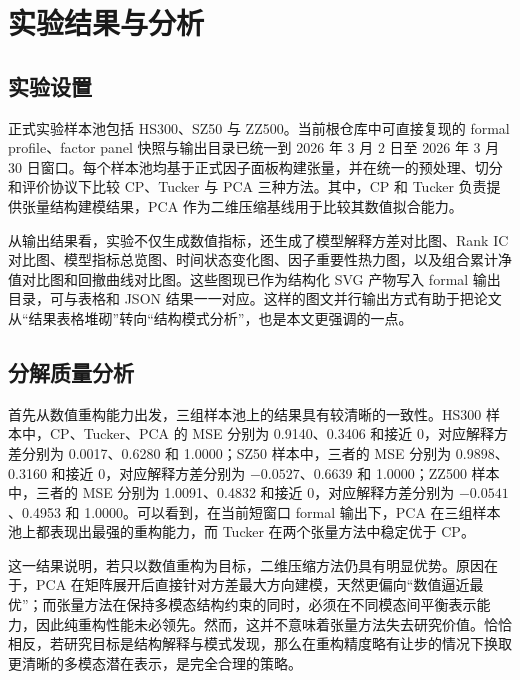 \chapter{实验结果与分析}

\section{实验设置}

正式实验样本池包括 HS300、SZ50 与 ZZ500。当前根仓库中可直接复现的 formal profile、factor panel 快照与输出目录已统一到 2026 年 3 月 2 日至 2026 年 3 月 30 日窗口。每个样本池均基于正式因子面板构建张量，并在统一的预处理、切分和评价协议下比较 CP、Tucker 与 PCA 三种方法。其中，CP 和 Tucker 负责提供张量结构建模结果，PCA 作为二维压缩基线用于比较其数值拟合能力。

从输出结果看，实验不仅生成数值指标，还生成了模型解释方差对比图、Rank IC 对比图、模型指标总览图、时间状态变化图、因子重要性热力图，以及组合累计净值对比图和回撤曲线对比图。这些图现已作为结构化 SVG 产物写入 formal 输出目录，可与表格和 JSON 结果一一对应。这样的图文并行输出方式有助于把论文从“结果表格堆砌”转向“结构模式分析”，也是本文更强调的一点。

\section{分解质量分析}

首先从数值重构能力出发，三组样本池上的结果具有较清晰的一致性。HS300 样本中，CP、Tucker、PCA 的 MSE 分别为 0.9140、0.3406 和接近 0，对应解释方差分别为 0.0017、0.6280 和 1.0000；SZ50 样本中，三者的 MSE 分别为 0.9898、0.3160 和接近 0，对应解释方差分别为 $-0.0527$、0.6639 和 1.0000；ZZ500 样本中，三者的 MSE 分别为 1.0091、0.4832 和接近 0，对应解释方差分别为 $-0.0541$、0.4953 和 1.0000。可以看到，在当前短窗口 formal 输出下，PCA 在三组样本池上都表现出最强的重构能力，而 Tucker 在两个张量方法中稳定优于 CP。

这一结果说明，若只以数值重构为目标，二维压缩方法仍具有明显优势。原因在于，PCA 在矩阵展开后直接针对方差最大方向建模，天然更偏向“数值逼近最优”；而张量方法在保持多模态结构约束的同时，必须在不同模态间平衡表示能力，因此纯重构性能未必领先。然而，这并不意味着张量方法失去研究价值。恰恰相反，若研究目标是结构解释与模式发现，那么在重构精度略有让步的情况下换取更清晰的多模态潜在表示，是完全合理的策略。

